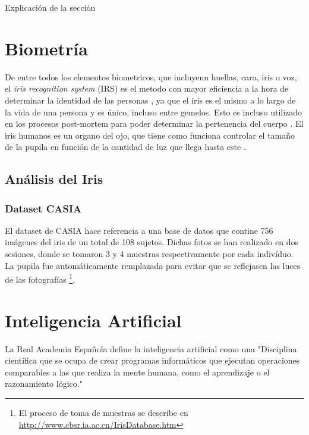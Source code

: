  \label{capitulo3}

Explicación de la sección


\section{Biometría}

De entre todos los elementos biometricos, que incluyenn huellas, cara, iris o voz, el \textit{iris recognition system} (IRS) es el metodo con mayor eficiencia a la hora de determinar la identidad
de las personas \cite{malgheet_iris_2021}, ya que el iris es el mismo a lo largo de la vida de una persona y es único, incluso entre gemelos. Esto es incluso utilizado en los procesos 
post-mortem para poder determinar la pertenencia del cuerpo \cite{boyd_post-mortem_2020}. El iris humanos es un organo del ojo, que tiene como funciona controlar el tamaño
de la pupila en función de la cantidad de luz que llega hasta este \cite{boyd_post-mortem_2020}.

\subsection{Análisis del Iris}	

\subsubsection{Dataset CASIA}	

El dataset de CASIA hace referencia a una base de datos que contine 756 imágenes del iris de un total de 108 sujetos. 
Dichas fotos se han realizado en dos sesiones, donde se tomaron 3 y 4 muestras respectivamente por cada indivíduo. 
La pupila fue automáticamente remplazada para evitar que se reflejasen las luces de las fotografías 
\footnote{El proceso de toma de muestras se describe en \url{http://www.cbsr.ia.ac.cn/IrisDatabase.htm}}.


\section{Inteligencia Artificial}

La Real Academia Española define la inteligencia artificial como una "Disciplina científica que se ocupa de crear programas informáticos que ejecutan 
operaciones comparables a las que realiza la mente humana, como el aprendizaje o el razonamiento lógico."

